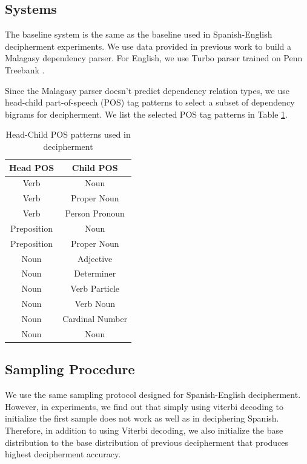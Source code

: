 \subsection{Systems}
The baseline system is the same as the baseline used in Spanish-English decipherment experiments. We use data provided in previous work \cite{dou-vaswani-knight:2014:EMNLP2014} to build a Malagasy dependency parser. For English, we use Turbo parser trained on Penn Treebank \cite{TurboParser}.  

Since the Malagasy parser doesn't predict dependency relation types, we use head-child part-of-speech (POS) tag patterns to select a subset of dependency bigrams for decipherment. We list the selected POS tag patterns in Table \ref{mlg-en-dep-type}.

%
 \begin{table}
 \begin{center}
 \begin{tabular}{ |c|c| } \hline
          Head POS & Child POS \\ \hline
Verb & Noun \\ \hline
Verb & Proper Noun \\ \hline
Verb & Person Pronoun \\ \hline
Preposition & Noun \\ \hline
Preposition & Proper Noun \\ \hline
Noun & Adjective \\ \hline
Noun & Determiner \\ \hline
Noun & Verb Particle \\ \hline
Noun & Verb Noun \\ \hline
Noun & Cardinal Number \\ \hline
Noun & Noun \\ \hline
 \end{tabular}
 \caption{Head-Child POS patterns used in decipherment}
 \label{mlg-en-dep-type}
 \end{center}
 \end{table}
%

\subsection{Sampling Procedure}
We use the same sampling protocol designed for Spanish-English decipherment. However, in experiments, we find out that simply using viterbi decoding to initialize the first sample does not work as well as in deciphering Spanish. Therefore, in addition to using Viterbi decoding, we also initialize the base distribution to the base distribution of previous decipherment that produces highest decipherment accuracy.

